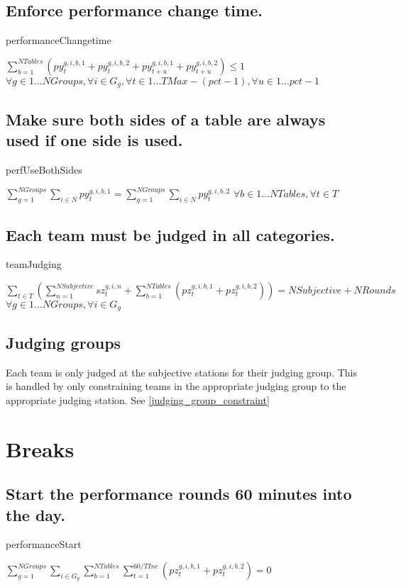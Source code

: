 \documentclass[letterpaper,11pt]{report}
\begin{document}
\FloatBarrier
\subsection{Enforce performance change time.}
\begin{algorithm}
\caption{performanceChangetime}
$
\sum\limits_{b=1}^{NTables} (
py_{t}^{g,i,b,1} + py_{t}^{g,i,b,2}
+
py_{t+u}^{g,i,b,1} + py_{t+u}^{g,i,b,2})
\le 1$
\hfill $
\forall g \in 1 \dots NGroups,
\forall i \in G_{g}, 
\forall t \in 1 \dots TMax - (pct - 1),
\forall u \in 1 \dots pct-1$
\end{algorithm}

\FloatBarrier
\subsection{Make sure both sides of a table are always used if one side is
  used.}
\begin{algorithm}
\caption{perfUseBothSides}
$\sum\limits_{g=1}^{NGroups}\sum\limits_{i \in N} py_{t}^{g,i,b,1} 
= 
\sum\limits_{g=1}^{NGroups}\sum\limits_{i \in N}py_{t}^{g,i,b,2}$
\hfill $
\forall b \in 1 \dots NTables,
\forall t \in T$
\end{algorithm}


\FloatBarrier
\subsection{Each team must be judged in all categories.}
\begin{algorithm}
\caption{teamJudging}
$\sum\limits_{t \in T} ( 
    \sum\limits_{n=1}^{NSubjective} sz_{t}^{g,i,n}
 + \sum\limits_{b=1}^{NTables} (pz_{t}^{g,i,b,1} + pz_{t}^{g,i,b,2})
)
= NSubjective + NRounds$
\hfill $
\forall g \in 1 \dots NGroups,
\forall i \in G_{g}$
\end{algorithm}

\FloatBarrier
\subsection{Judging groups}
Each team is only judged at the subjective stations for their judging
group. This is handled by only constraining teams in the appropriate
judging group to the appropriate judging station. See \autoref{judging_group_constraint}


\FloatBarrier
\section{Breaks}
\subsection{Start the performance rounds 60 minutes into the day.}
\begin{algorithm}
\caption{performanceStart}
$
\sum\limits_{g=1}^{NGroups}
\sum\limits_{i \in G_{g}} 
  \sum\limits_{b=1}^{NTables} 
    \sum\limits_{t = 1}^{60/TInc} 
      ( pz_{t}^{g,i,b,1} + pz_{t}^{g,i,b,2} ) = 0$
\end{algorithm}
    
\end{document}
